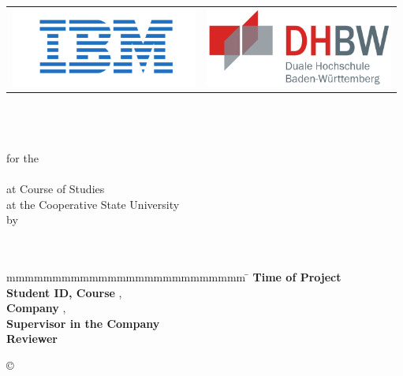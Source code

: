 \begin{titlepage}
	\begin{longtable}{p{} p{}}
	  {\includegraphics[height=2.6cm]{images/logo.png}} & 
	  {\includegraphics[height=2.6cm]{images/dhbw.png}}
	\end{longtable}
	\enlargethispage{20mm}
	\begin{center}
	  \vspace*{12mm}	{\LARGE\bf \titel }\\
	  \vspace*{4mm}    {\large \untertitel}\\
	  \vspace*{12mm}	{\large\bf \arbeit}\\
	  \vspace*{12mm}	for the\\
	  \vspace*{3mm} 	{\bf \abschluss}\\
	  \vspace*{12mm}	at Course of Studies \studiengang\\
	  \vspace*{3mm} 	at the Cooperative State University \dhbw\\
	  \vspace*{12mm}	by\\
	  \vspace*{3mm} 	{\large\bf \autor}\\
	  \vspace*{12mm}	\datumAbgabe\\
	\end{center}
	\vfill
	\begin{spacing}{1.2}
	\begin{tabbing}
		mmmmmmmmmmmmmmmmmmmmmmmmmm     \= \kill
		\textbf{Time of Project}  \>  \zeitraum\\
		\textbf{Student ID, Course}  \>  \matrikelnr, \kurs\\
		\textbf{Company}      \>  \firma, \small{\textit{\firmenort}}\\
		\textbf{Supervisor in the Company}              \>  \betreuer\\
		\textbf{Reviewer}             \>  \gutachter
	\end{tabbing}
	\end{spacing}
	\begin{flushright} 
	\copyright{} \jahr 
	\end{flushright} 
\end{titlepage}
